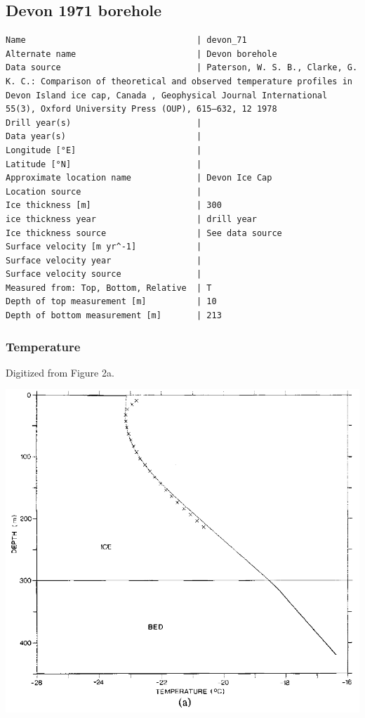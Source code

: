 \documentclass[article,a4paper,times,11pt,twoside]{article}
\begin{document}
\subsection{Devon 1971 borehole}
\label{sec:orgbc33dd5}
\begin{verbatim}
Name                                  | devon_71
Alternate name                        | Devon borehole
Data source                           | Paterson, W. S. B., Clarke, G. K. C.: Comparison of theoretical and observed temperature profiles in Devon Island ice cap, Canada , Geophysical Journal International 55(3), Oxford University Press (OUP), 615–632, 12 1978 
Drill year(s)                         | 
Data year(s)                          | 
Longitude [°E]                        | 
Latitude [°N]                         | 
Approximate location name             | Devon Ice Cap
Location source                       | 
Ice thickness [m]                     | 300
ice thickness year                    | drill year
Ice thickness source                  | See data source
Surface velocity [m yr^-1]            | 
Surface velocity year                 | 
Surface velocity source               | 
Measured from: Top, Bottom, Relative  | T
Depth of top measurement [m]          | 10
Depth of bottom measurement [m]       | 213
\end{verbatim}

\subsubsection{Temperature}
\label{sec:org0336ee2}

Digitized from \textcite{paterson_1978} Figure 2a.

\begin{center}
\includegraphics[width=.9\linewidth]{devon_71/paterson_1978_fig2a.png}
\end{center}
\end{document}

